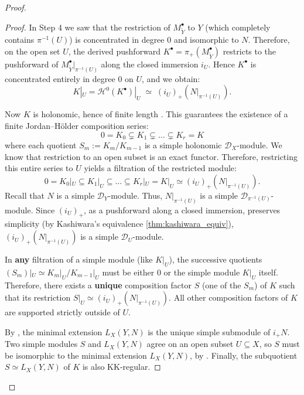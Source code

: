 \begin{remark}
\begin{proof}
\begin{enumerate}
\begin{proof}
                      In Step 4 we saw that the restriction of $M^\bullet_{\widetilde Y}$ to $Y$ (which completely contains $\pi^{-1}(U)$) is concentrated in degree $0$ and isomorphic to $N$.
                      Therefore, on the open set $U$, the derived pushforward $K^\bullet = \pi_+(M^\bullet_{\widetilde Y})$ restricts to the pushforward of $M^\bullet_{\widetilde Y}|_{\pi^{-1}(U)}$ along the closed immersion $i_U$. Hence $K^\bullet$ is concentrated entirely in degree $0$ on $U$, and we obtain:
                      \[
                          K|_U = \mathcal H^0(K^\bullet)|_U \;\simeq\; (i_U)_+(N|_{\pi^{-1}(U)}) .
                      \]

                      Now $K$ is holonomic, hence of finite length \cite[Prop.~3.1.2]{hotta2008d}.
                      This guarantees the existence of a finite Jordan--H\"older composition series:
                      \[
                          0 = K_0 \subsetneq K_1 \subsetneq \dots \subsetneq K_r = K
                      \]
                      where each quotient $S_m := K_m / K_{m-1}$ is a simple holonomic $\mathcal D_X$-module.
                      We know that restriction to an open subset is an exact functor. Therefore, restricting this entire series to $U$ yields a filtration of the restricted module:
                      \[
                          0 = K_0|_U \subseteq K_1|_U \subseteq \dots \subseteq K_r|_U = K|_U \simeq (i_U)_+(N|_{\pi^{-1}(U)}).
                      \]
                      Recall that $N$ is a simple $\mathcal D_Y$-module. Thus, $N|_{\pi^{-1}(U)}$ is a simple $\mathcal D_{\pi^{-1}(U)}$-module.
                      Since $(i_U)_+$, as a pushforward along a closed immersion, preserves simplicity (by Kashiwara's equivalence \ref{thm:kashiwara_equiv}), $(i_U)_+(N|_{\pi^{-1}(U)})$ is a simple $\mathcal D_U$-module.

                      In \textbf{any} filtration of a simple module (like $K|_U$), the successive quotients $(S_m)|_U \simeq K_m|_U / K_{m-1}|_U$ must be either $0$ or the simple module $K|_U$ itself.
                      Therefore, there exists a \textbf{unique} composition factor $S$ (one of the $S_m$) of $K$ such that its restriction $S|_U \simeq (i_U)_+(N|_{\pi^{-1}(U)})$. All other composition factors of $K$ are supported strictly outside of $U$.

                      By \cite[Thm.~3.4.2]{hotta2008d}, the minimal extension $L_X(Y,N)$ is the unique simple submodule of $i_+ N$.
                      Two simple modules $S$ and $L_X(Y,N)$ agree on an open subset $U\subseteq X $, so $S$ must be isomorphic to the minimal extension $L_X(Y,N)$, by \cite[Prop.~3.1.7]{hotta2008d}.
                      Finally, the subquotient $S\simeq L_X(Y,N)$ of $K$ is also KK-regular.


\end{proof}
\end{enumerate}
\end{proof}
\end{remark}
